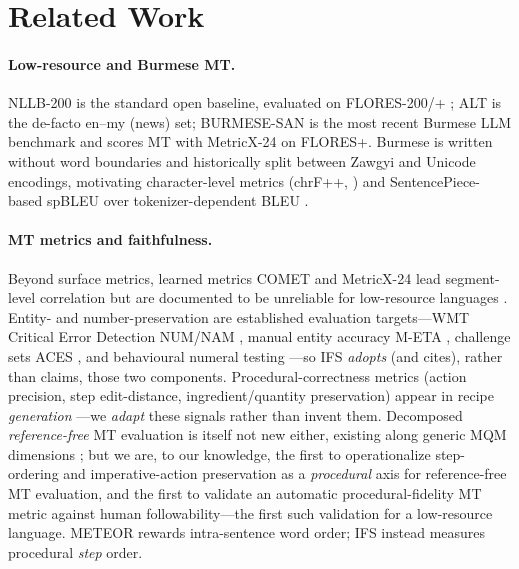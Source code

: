 \documentclass[11pt]{article}
\begin{document}
\section{Related Work}
\paragraph{Low-resource and Burmese MT.} NLLB-200 \citep{nllb2024} is the standard open
baseline, evaluated on FLORES-200/+ \citep{flores200,floresplus2024}; ALT \citep{alt2016}
is the de-facto en--my (news) set; BURMESE-SAN \citep{burmesesan2026} is the most recent
Burmese LLM benchmark and scores MT with MetricX-24 \citep{metricx2024} on FLORES+.
Burmese is written without word boundaries and historically split between Zawgyi and
Unicode encodings, motivating character-level metrics (chrF++, \citealp{chrfpp2017}) and
SentencePiece-based spBLEU \citep{flores101spbleu2022} over tokenizer-dependent BLEU
\citep{bleu2002}.

\paragraph{MT metrics and faithfulness.} Beyond surface metrics, learned metrics
COMET \citep{comet2020} and MetricX-24 \citep{metricx2024} lead segment-level correlation
but are documented to be unreliable for low-resource languages
\citep{falcao2024comet,africomet2024}. Entity- and number-preservation are established
evaluation targets---WMT Critical Error Detection NUM/NAM \citep{wmtced2022}, manual entity
accuracy M-ETA \citep{meta2024}, challenge sets ACES \citep{aces2022}, and behavioural numeral
testing \citep{wang2021numerals}---so IFS \emph{adopts} (and cites), rather than claims, those
two components. Procedural-correctness
metrics (action precision, step edit-distance, ingredient/quantity preservation) appear in
recipe \emph{generation} \citep{recipegen2025}---we \emph{adapt} these signals rather than
invent them. Decomposed \emph{reference-free} MT evaluation is itself not new either, existing
along generic MQM dimensions \citep{park2024multidim}; but we are, to our knowledge, the first to
operationalize step-ordering and imperative-action preservation as a \emph{procedural} axis for
reference-free MT evaluation, and the first to validate an automatic procedural-fidelity MT
metric against human followability---the first such validation for a low-resource language. METEOR \citep{meteor2005} rewards
intra-sentence word order; IFS instead measures procedural \emph{step} order.
\end{document}
